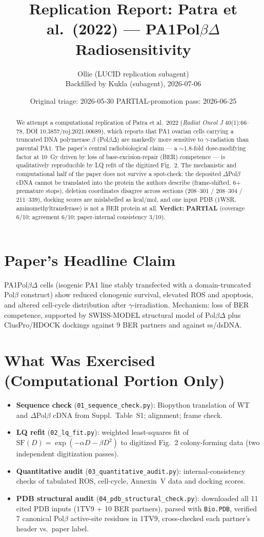 \documentclass[11pt]{article}
\title{Replication Report: Patra et al.\ (2022) --- PA1Pol$\beta\Delta$ Radiosensitivity}
\author{Ollie (LUCID replication subagent) \\ Backfilled by Kukla (subagent), 2026-07-06}
\date{Original triage: 2026-05-30 \quad PARTIAL-promotion pass: 2026-06-25}
\begin{document}
\maketitle

\begin{abstract}
We attempt a computational replication of Patra et al.\ 2022 (\textit{Radiat Oncol J} 40(1):66--78, DOI 10.3857/roj.2021.00689), which reports that PA1 ovarian cells carrying a truncated DNA polymerase $\beta$ (Pol$\beta\Delta$) are markedly more sensitive to $\gamma$-radiation than parental PA1. The paper's central radiobiological claim --- a $\sim$1.8-fold dose-modifying factor at 10~Gy driven by loss of base-excision-repair (BER) competence --- is qualitatively reproducible by LQ refit of the digitized Fig.~2. The mechanistic and computational half of the paper does not survive a spot-check: the deposited $\Delta$Pol$\beta$ cDNA cannot be translated into the protein the authors describe (frame-shifted, 6+ premature stops), deletion coordinates disagree across sections (208--301 / 208--304 / 211--339), docking scores are mislabelled as kcal/mol, and one input PDB (1WSR, aminomethyltransferase) is not a BER protein at all. \textbf{Verdict: PARTIAL} (coverage 6/10; agreement 6/10; paper-internal consistency 3/10).
\end{abstract}

\section{Paper's Headline Claim}
PA1Pol$\beta\Delta$ cells (isogenic PA1 line stably transfected with a domain-truncated Pol$\beta$ construct) show reduced clonogenic survival, elevated ROS and apoptosis, and altered cell-cycle distribution after $\gamma$-irradiation. Mechanism: loss of BER competence, supported by SWISS-MODEL structural model of Pol$\beta\Delta$ plus ClusPro/HDOCK dockings against 9 BER partners and against ss/dsDNA.

\section{What Was Exercised (Computational Portion Only)}
\begin{itemize}
  \item \textbf{Sequence check} (\texttt{01\_sequence\_check.py}): Biopython translation of WT and $\Delta$Pol$\beta$ cDNA from Suppl.\ Table~S1; alignment; frame check.
  \item \textbf{LQ refit} (\texttt{02\_lq\_fit.py}): weighted least-squares fit of $\mathrm{SF}(D) = \exp(-\alpha D - \beta D^2)$ to digitized Fig.~2 colony-forming data (two independent digitization passes).
  \item \textbf{Quantitative audit} (\texttt{03\_quantitative\_audit.py}): internal-consistency checks of tabulated ROS, cell-cycle, Annexin~V data and docking scores.
  \item \textbf{PDB structural audit} (\texttt{04\_pdb\_structural\_check.py}): downloaded all 11 cited PDB inputs (1TV9 + 10 BER partners), parsed with \texttt{Bio.PDB}, verified 7 canonical Pol$\beta$ active-site residues in 1TV9, cross-checked each partner's header vs.\ paper label.
\end{itemize}
\end{document}
